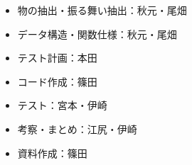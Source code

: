 \begin{itemize}
  \item 物の抽出・振る舞い抽出：秋元・尾畑
  \item データ構造・関数仕様：秋元・尾畑
  \item テスト計画：本田
  \item コード作成：篠田
  \item テスト：宮本・伊崎
  \item 考察・まとめ：江尻・伊崎
  \item 資料作成：篠田
\end{itemize}
